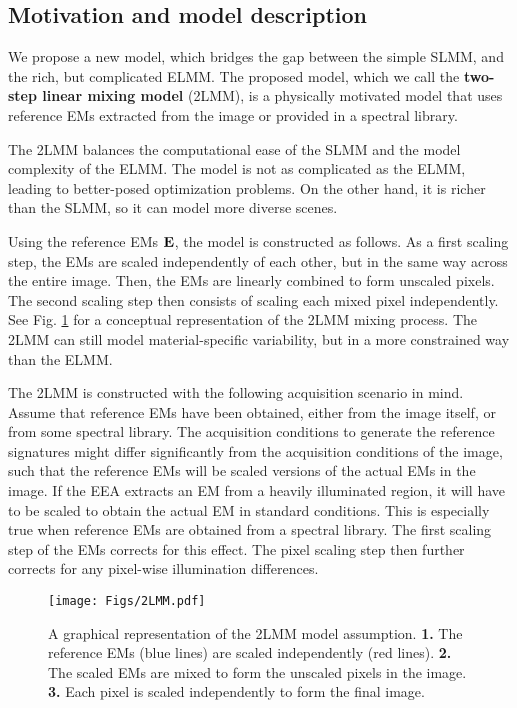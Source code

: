 \subsection{Motivation and model description} 

We propose a new model, which bridges the gap between the simple SLMM, and the rich, but complicated ELMM. The proposed model, which we call the \textbf{two-step linear mixing model} (2LMM), is a physically motivated model that uses reference EMs extracted from the image or provided in a spectral library.

The 2LMM balances the computational ease of the SLMM and the model complexity of the ELMM. The model is not as complicated as the ELMM, leading to better-posed optimization problems. On the other hand, it is richer than the SLMM, so it can model more diverse scenes.

Using the reference EMs $\mathbf{E}$, the model is constructed as follows. As a first scaling step, the EMs are scaled independently of each other, but in the same way across the entire image. Then, the EMs are  linearly combined to form unscaled pixels. The second scaling step then consists of scaling each mixed pixel independently. See Fig. \ref{fig: 2lmm concept} for a conceptual representation of the 2LMM mixing process.  The 2LMM can still model material-specific variability, but in a more constrained way than the ELMM. 

The 2LMM is constructed with the following acquisition scenario in mind. Assume that reference EMs have been obtained, either from the image itself, or from some spectral library. The acquisition conditions to generate  the reference signatures might differ significantly from the acquisition conditions of  the image, such that the reference EMs will be scaled versions of the actual EMs in the image. If the EEA extracts an EM from a heavily illuminated region, it will have to be scaled to obtain the actual EM in standard conditions. This is especially true when reference EMs are obtained from a spectral library. The first scaling step of the EMs  corrects for this effect. The pixel scaling step  then further corrects for any pixel-wise illumination differences. 

\begin{figure}
    \centering
    \texttt{[image: Figs/2LMM.pdf]}
    \caption{A graphical representation of the 2LMM model assumption. \textbf{1.} The reference EMs (blue lines) are scaled independently (red lines). \textbf{2.} The scaled EMs are mixed to form the unscaled pixels in the image. \textbf{3.} Each pixel is scaled independently to form the final image.}
    \label{fig: 2lmm concept}
\end{figure}

